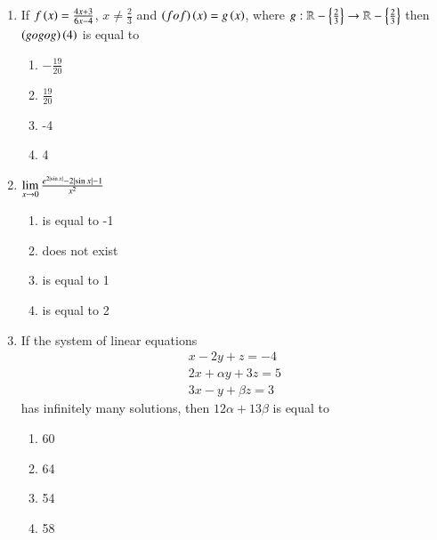 \documentclass[journal]{IEEEtran}
\begin{document}
\begin{enumerate}
    \item If $f\left(x\right) = \frac{4x+3}{6x-4}$, $x \ne \frac{2}{3}$ and
    $\left(fof\right)\left(x\right) = g\left(x\right)$, where $g:\mathbb{R} - \left\{\frac{2}{3}\right\} \to
    \mathbb{R} - \left\{\frac{2}{3}\right\}$ then $\left(gogog\right)\left(4\right)$ is equal to
    
    \begin{multicols}{4}
\begin{enumerate}

        \item $-\frac{19}{20}$
        \item $\frac{19}{20}$
        \item -4
        \item 4
    \end{enumerate}
\end{multicols}

    \item $\lim\limits_{x \to 0} \frac{e^{2\left\vert\sin x\right\vert} - 2\left\vert\sin x\right\vert - 1}{x^2}$
    
    \begin{multicols}{4}
\begin{enumerate}

        \item is equal to -1 
        \item does not exist
        \item is equal to 1 
        \item is equal to 2 
    \end{enumerate}
\end{multicols}

    \item If the system of linear equations
    \begin{align*}
        x - 2y + z = -4 \\
        2x + \alpha y + 3z = 5 \\
        3x - y + \beta z = 3
    \end{align*}
    has infinitely many solutions, then $12\alpha + 13\beta$ is equal to

    \begin{multicols}{4}
\begin{enumerate}

        \item 60
        \item 64
        \item 54
        \item 58
    \end{enumerate}
\end{multicols}


\end{enumerate}
\end{document}
